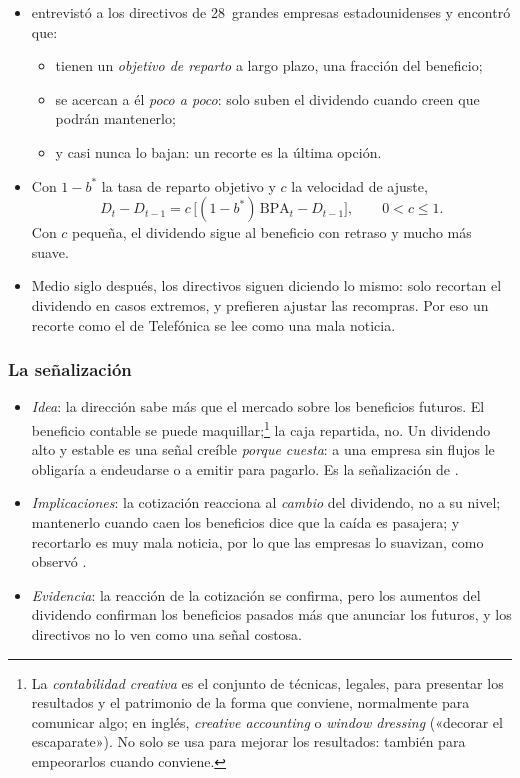 \documentclass[11pt]{article}
\begin{document}
\begin{itemize}
\item \textcite{Lintner1956Distribution} entrevistó a los directivos de 28~grandes empresas estadounidenses y encontró que:
  \begin{itemize}
  \item tienen un \emph{objetivo de reparto} a largo plazo, una fracción del beneficio;
  \item se acercan a él \emph{poco a poco}: solo suben el dividendo cuando creen que podrán mantenerlo;
  \item y casi nunca lo bajan: un recorte es la última opción.
  \end{itemize}
\item Con $1-b^*$ la tasa de reparto objetivo y $c$ la velocidad de ajuste,
  \begin{equation}\label{eq:lintner}
  D_t-D_{t-1}=c\,\big[(1-b^{*})\,\mathrm{BPA}_t-D_{t-1}\big],\qquad 0<c\leq1.
  \end{equation}
  Con $c$ pequeña, el dividendo sigue al beneficio con retraso y mucho más suave.
\item Medio siglo después, los directivos siguen diciendo lo mismo: solo recortan el dividendo en casos extremos, y prefieren ajustar las recompras\nocite{BravEtAl2005Payout}. Por eso un recorte como el de Telefónica se lee como una mala noticia.
\end{itemize}

\subsubsection{La señalización}\label{sec:senal-dividendos}

\begin{itemize}
\item \emph{Idea}: la dirección sabe más que el mercado sobre los beneficios futuros. El beneficio contable se puede maquillar;\footnote{La \emph{contabilidad creativa} es el conjunto de técnicas, legales, para presentar los resultados y el patrimonio de la forma que conviene, normalmente para comunicar algo; en inglés, \emph{creative accounting} o \emph{window dressing} («decorar el escaparate»). No solo se usa para mejorar los resultados: también para empeorarlos cuando conviene.} la caja repartida, no. Un dividendo alto y estable es una señal creíble \emph{porque cuesta}: a una empresa sin flujos le obligaría a endeudarse o a emitir para pagarlo\nocite{Bhattacharya1979Imperfect,MillerRock1985Dividend}. Es la señalización de  .
\item \emph{Implicaciones}: la cotización reacciona al \emph{cambio} del dividendo, no a su nivel; mantenerlo cuando caen los beneficios dice que la caída es pasajera; y recortarlo es muy mala noticia, por lo que las empresas lo suavizan, como observó .
\item \emph{Evidencia}: la reacción de la cotización se confirma, pero los aumentos del dividendo confirman los beneficios pasados más que anunciar los futuros\nocite{BenartziMichaelyThaler1997Do}, y los directivos no lo ven como una señal costosa\nocite{BravEtAl2005Payout}.
\end{itemize}
\end{document}
